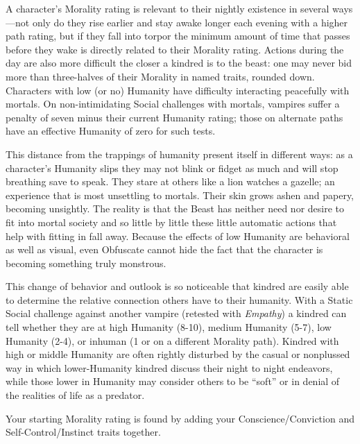 A character's Morality rating is relevant to their nightly existence 
in several ways---not only do they rise earlier and stay awake longer 
each evening with a higher path rating, but if they fall into torpor 
the minimum amount of time that passes before they wake is directly 
related to their Morality rating.  Actions during the day are also 
more difficult the closer a kindred is to the beast:  one may never bid 
more than three-halves of their Morality in named traits, rounded down.  
Characters with low (or no) Humanity have difficulty interacting peacefully 
with mortals.  On non-intimidating Social challenges with mortals, vampires 
suffer a penalty of seven minus their current Humanity rating; those 
on alternate paths have an effective Humanity of zero for such tests.

This distance from the trappings of humanity present itself in different 
ways:  as a character's Humanity slips they may not blink or fidget as much 
and will stop breathing save to speak.  They stare at others like a lion 
watches a gazelle; an experience that is most unsettling to mortals. Their 
skin grows ashen and papery, becoming unsightly.  The reality is that the 
Beast has neither need nor desire to fit into mortal society and so little by 
little these little automatic actions that help with fitting in fall away.  
Because the effects of low Humanity are behavioral as well as visual, even Obfuscate 
cannot hide the fact that the character is becoming something truly monstrous.

This change of behavior and outlook is so noticeable that kindred are easily able 
to determine the relative connection others have to their humanity.  With a Static 
Social challenge against another vampire (retested with \emph{Empathy}) a kindred 
can tell whether they are at high Humanity (8-10), medium Humanity (5-7), low 
Humanity (2-4), or inhuman (1 or on a different Morality path).  Kindred with high or 
middle Humanity are often rightly disturbed by the casual or nonplussed way in which 
lower-Humanity kindred discuss their night to night endeavors, while those lower in 
Humanity may consider others to be ``soft'' or in denial of the realities of life as a 
predator.

Your starting Morality rating is found by adding your Conscience/Conviction 
and Self-Control/Instinct traits together.

